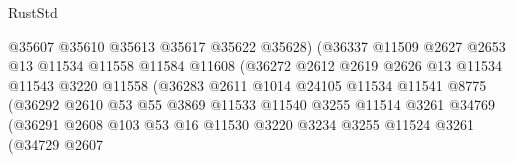 \begin{lexlean}{RustStd}
\begin{coremodule}
                                      @35607
                                      @35610
                                      @35613
                                      @35617
                                      @35622
                                      @35628)
                                    (@36337
                                      @11509
                                      @2627
                                      @2653
                                      @13
                                      @11534
                                      @11558
                                      @11584
                                      @11608
                                      (@36272
                                        @2612
                                        @2619
                                        @2626
                                        @13
                                        @11534
                                        @11543
                                        @3220
                                        @11558
                                        (@36283
                                          @2611
                                          @1014
                                          @24105
                                          @11534
                                          @11541
                                          @8775
                                          (@36292
                                            @2610
                                            @53
                                            @55
                                            @3869
                                            @11533
                                            @11540
                                            @3255
                                            @11514
                                            @3261
                                            @34769
                                            (@36291
                                              @2608
                                              @103
                                              @53
                                              @16
                                              @11530
                                              @3220
                                              @3234
                                              @3255
                                              @11524
                                              @3261
                                              (@34729
                                                @2607

\end{coremodule}
\end{lexlean}
